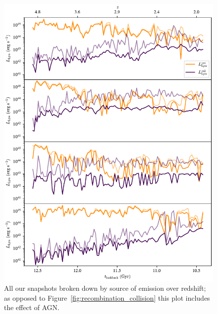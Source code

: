 \begin{figure}
    \centering
    \includegraphics[width=\textwidth,height=\textheight,keepaspectratio]{figures/agn_recombination_collision.pdf}
    \caption{All our snapshots broken down by source of emission over redshift; as opposed to Figure~\ref{fig:recombination_collision} this plot includes the effect of AGN.}
    \label{fig:agn_recombination_collision}
\end{figure}


